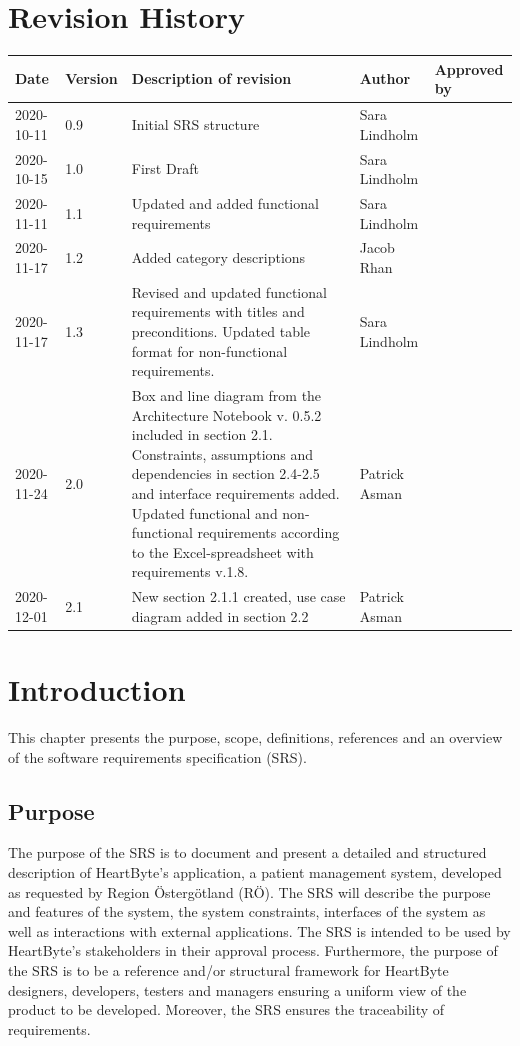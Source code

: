 \documentclass{scrreprt}
\begin{document}
\chapter*{Revision History}
\begin{center}
\begin{tabular}{|p{}|p{}|p{4.6cm}|p{2.5cm}|p{2.5cm}|}
 \hline
 \textbf{Date} & \textbf{Version} & \textbf{Description of revision} & \textbf{Author} & \textbf{Approved by} \\ 
 \hline
 2020-10-11 & 0.9 & Initial SRS structure & Sara Lindholm & \\
 \hline
 2020-10-15 & 1.0 & First Draft & Sara Lindholm & \\ 
 \hline
 2020-11-11 & 1.1 & Updated and added functional requirements & Sara Lindholm & \\
 \hline
 2020-11-17 & 1.2 & Added category descriptions & Jacob Rhan & \\
 \hline
 2020-11-17 & 1.3 & Revised and updated functional requirements with titles and preconditions. Updated table format for non-functional requirements. & Sara Lindholm & \\
 \hline 
 2020-11-24 & 2.0 & Box and line diagram from the Architecture Notebook v. 0.5.2 included in section 2.1. Constraints, assumptions and dependencies in section 2.4-2.5 and interface requirements added. Updated functional and non-functional requirements according to the Excel-spreadsheet with requirements v.1.8. & Patrick Asman & \\
 \hline
 2020-12-01 & 2.1 & New section 2.1.1 created, use case diagram added in section 2.2 & Patrick Asman & \\
 \hline 
\end{tabular}
\end{center}

\tableofcontents

\chapter{Introduction}
This chapter presents the purpose, scope, definitions, references and an overview of the software requirements specification (SRS). 

\section{Purpose}
The purpose of the SRS is to document and present a detailed and structured description of HeartByte's application, a patient management system, developed as requested by Region Östergötland (RÖ). The SRS will describe the purpose and features of the system, the system constraints, interfaces of the system as well as interactions with external applications. The SRS is intended to be used by HeartByte’s stakeholders in their approval process. Furthermore, the purpose of the SRS is to be a reference and/or structural framework for HeartByte designers, developers, testers and managers ensuring a uniform view of the product to be developed. Moreover, the SRS ensures the traceability of requirements.
\end{document}
